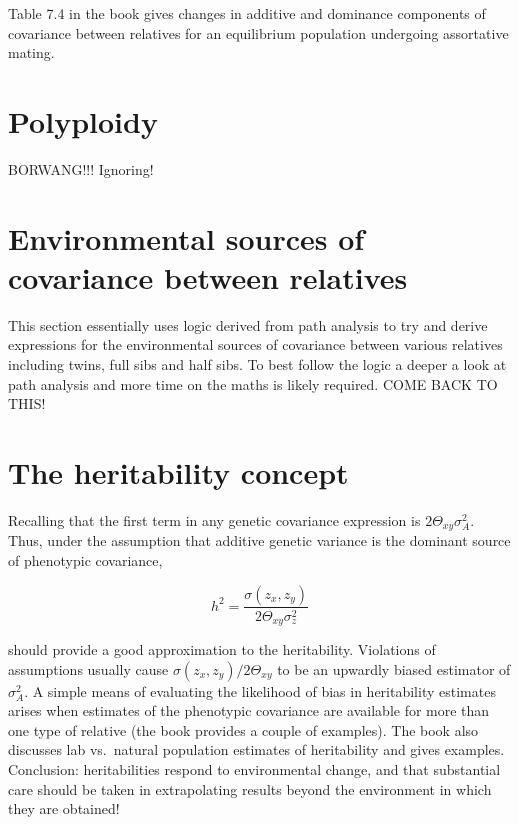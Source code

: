 \documentclass[
]{book}
\begin{document}
Table 7.4 in the book gives changes in additive and dominance components of covariance between relatives for an equilibrium population undergoing assortative mating.

\hypertarget{polyploidy-1}{%
\section{Polyploidy}\label{polyploidy-1}}

BORWANG!!! Ignoring!

\hypertarget{environmental-sources-of-covariance-between-relatives}{%
\section{Environmental sources of covariance between relatives}\label{environmental-sources-of-covariance-between-relatives}}

This section essentially uses logic derived from path analysis to try and derive expressions for the environmental sources of covariance between various relatives including twins, full sibs and half sibs. To best follow the logic a deeper a look at path analysis and more time on the maths is likely required. COME BACK TO THIS!

\hypertarget{the-heritability-concept}{%
\section{The heritability concept}\label{the-heritability-concept}}

Recalling that the first term in any genetic covariance expression is \(2\Theta_{xy}\sigma^2_{A}\). Thus, under the assumption that additive genetic variance is the dominant source of phenotypic covariance,

\begin{equation}
    h^2 = \frac{\sigma(z_x, z_y)} {2\Theta_{xy} \sigma^2_z}
    \label{eq:approximate-narrow-sense-heritability}
\end{equation}

should provide a good approximation to the heritability. Violations of assumptions usually cause \(\sigma(z_x, z_y) / 2\Theta_{xy}\) to be an upwardly biased estimator of \(\sigma^2_A\). A simple means of evaluating the likelihood of bias in heritability estimates arises when estimates of the phenotypic covariance are available for more than one type of relative (the book provides a couple of examples). The book also discusses lab vs.~natural population estimates of heritability and gives examples. Conclusion: heritabilities respond to environmental change, and that substantial care should be taken in extrapolating results beyond the environment in which they are obtained!
\end{document}
